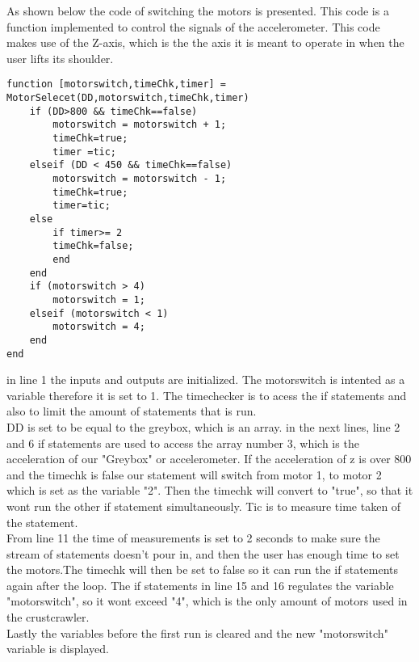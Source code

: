 As shown below the code of switching the motors is presented. This code is a function implemented to control the signals of the accelerometer. This code makes use of the Z-axis, which is the the axis it is meant to operate in when the user lifts its shoulder.\\
\begin{lstlisting}[frame=single] 
function [motorswitch,timeChk,timer] = MotorSelecet(DD,motorswitch,timeChk,timer)
    if (DD>800 && timeChk==false)
        motorswitch = motorswitch + 1;
        timeChk=true;
        timer =tic;
    elseif (DD < 450 && timeChk==false)
        motorswitch = motorswitch - 1;
        timeChk=true;
        timer=tic;
    else
        if timer>= 2
        timeChk=false;
        end
    end   
    if (motorswitch > 4)
        motorswitch = 1;
    elseif (motorswitch < 1)
        motorswitch = 4;
    end  
end
  \end{lstlisting}
  in line 1 the inputs and outputs are initialized. The motorswitch is intented as a variable therefore it is set to 1. The timechecker is to acess the if statements and also to limit the amount of statements that is run.\\
  DD is set to be equal to the greybox, which is an array. in the next lines, line 2 and 6 if statements are used to access the array number 3, which is the acceleration of our "Greybox" or accelerometer. If the acceleration of z is over 800 and the timechk is false our statement will switch from motor 1, to motor 2 which is set as the variable "2". Then the timechk will convert to "true", so that it wont run the other if statement simultaneously. Tic is to measure time taken of the statement.\\
  From line 11 the time of measurements is set to 2 seconds to make sure the stream of statements doesn't pour in, and then the user has enough time to set the motors.The timechk will then be set to false so it can run the if statements again after the loop. The if statements in line 15 and 16 regulates the variable "motorswitch", so it wont exceed "4", which is the only amount of motors used in the crustcrawler.\\
  Lastly the variables before the first run is cleared and the new "motorswitch" variable is displayed.\\
  
  
